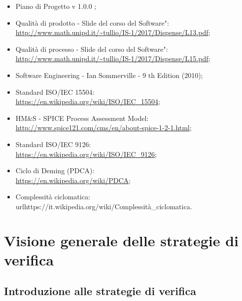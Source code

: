 \documentclass[openany,12pt,a4paper]{report}
\begin{document}
    \begin{itemize}
        \item Piano di Progetto v 1.0.0 ;
        
        \item Qualità di prodotto - Slide del corso \Ingegneria del
        Software": 
        \\ \url{http://www.math.unipd.it/~tullio/IS-1/2017/Dispense/L13.pdf};
        
        \item Qualità di processo - Slide del corso \Ingegneria del Software": \\ \url{http://www.math.unipd.it/~tullio/IS-1/2017/Dispense/L15.pdf};
        
        \item Software Engineering - Ian Sommerville - 9 th Edition (2010);
        
        \item Standard ISO/IEC 15504: 
        \\ \url{https://en.wikipedia.org/wiki/ISO/IEC_15504};
        
        \item HM&S - SPICE Process Assessment Model: 
        \\ \url{http://www.spice121.com/cms/en/about-spice-1-2-1.html};
        
        \item Standard ISO/IEC 9126:
        \\ \url{https://en.wikipedia.org/wiki/ISO/IEC_9126};
        
        \item Ciclo di Deming (PDCA): 
        \\ \url{https://en.wikipedia.org/wiki/PDCA};
        
        \item Complessità ciclomatica: 
        \\url{https://it.wikipedia.org/wiki/Complessità_ciclomatica}.
    \end{itemize}


\chapter{Visione generale delle strategie di verifica}
    
    \section{Introduzione alle strategie di verifica}
    
\end{document}
